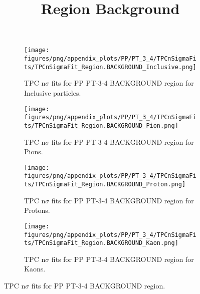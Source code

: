             \begin{figure}[H]
                \title{Region Background}
                \begin{subfigure}[b]{0.5\textwidth}
                    \centering
                    \texttt{[image: figures/png/appendix\_plots/PP/PT\_3\_4/TPCnSigmaFits/TPCnSigmaFit\_Region.BACKGROUND\_Inclusive.png]}
                    \caption{TPC n$\sigma$ fits for PP PT-3-4 BACKGROUND region for Inclusive particles.}
                    \label{fig:appendix_PP_PT-3-4_BACKGROUND_Inclusive}
                \end{subfigure}
                \begin{subfigure}[b]{0.5\textwidth}
                    \centering
                    \texttt{[image: figures/png/appendix\_plots/PP/PT\_3\_4/TPCnSigmaFits/TPCnSigmaFit\_Region.BACKGROUND\_Pion.png]}
                    \caption{TPC n$\sigma$ fits for PP PT-3-4 BACKGROUND region for Pions.}
                    \label{fig:appendix_PP_PT-3-4_BACKGROUND_Pion}
                \end{subfigure}
                \begin{subfigure}[b]{0.5\textwidth}
                    \centering
                    \texttt{[image: figures/png/appendix\_plots/PP/PT\_3\_4/TPCnSigmaFits/TPCnSigmaFit\_Region.BACKGROUND\_Proton.png]}
                    \caption{TPC n$\sigma$ fits for PP PT-3-4 BACKGROUND region for Protons.}
                    \label{fig:appendix_PP_PT-3-4_BACKGROUND_Proton}
                \end{subfigure}
                \begin{subfigure}[b]{0.5\textwidth}
                    \centering
                    \texttt{[image: figures/png/appendix\_plots/PP/PT\_3\_4/TPCnSigmaFits/TPCnSigmaFit\_Region.BACKGROUND\_Kaon.png]}
                    \caption{TPC n$\sigma$ fits for PP PT-3-4 BACKGROUND region for Kaons.}
                    \label{fig:appendix_PP_PT-3-4_BACKGROUND_Kaon}
                \end{subfigure}
                \caption{TPC n$\sigma$ fits for PP PT-3-4 BACKGROUND region.}
                \label{fig:appendix_PP_PT-3-4_BACKGROUND}
            \end{figure}
            \clearpage
            
    
